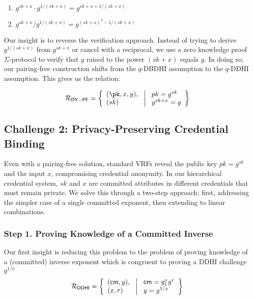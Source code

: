 \begin{enumerate}
    \item $g^{sk+x} \cdot g^{1/(sk+x)} = g^{sk+x+1/(sk+x)}$
    \item $g^{sk+x}/g^{1/(sk+x)} = g^{(sk+x)^2-1/(sk+x)}$
\end{enumerate}

Our insight is to reverse the verification approach. Instead of trying to derive $g^{1/(sk+x)}$ from $g^{sk+x}$ or cancel with a reciprocal, we use a zero knowledge proof $\Sigma$-protocol to verify that $y$ raised to the power $(sk+x)$ equals $g$. In doing so, our pairing-free construction shifts from the $q$-DBDHI assumption to the $q$-DDHI assumption. This gives us the relation:

\[
\mathcal{R}_{\mathsf{DY-PF}} = \left\{ 
\begin{array}{l} 
(\pk, x, y),\\
(sk) 
\end{array}
\ \middle|
\ \begin{array}{l}
pk = g^{sk} \\
y^{sk + x} = g  \\
\end{array} \right\}
\]

\subsection{Challenge 2: Privacy-Preserving Credential Binding}

Even with a pairing-free solution, standard VRFs reveal the public key $pk = g^{sk}$ and the input $x$,  compromising credential anonymity. In our hierarchical credential system, $sk$ and $x$ are committed attributes in different credentials that must remain private. We solve this through a two-step approach: first, addressing the simpler case of a single committed exponent, then extending to linear combinations.

\subsubsection*{Step 1. Proving Knowledge of a Committed Inverse}
Our first insight is reducing this problem to the problem of proving knowledge of a (committed) inverse exponent which is congruent to proving a DDHI challenge $g^{1/x}$
\[
\mathcal{R}_{\mathsf{DDHI}} = \left\{ 
\begin{array}{l} (\mathsf{cm}, y),\\
(x, r) 
\end{array}
\ \middle|
\ \begin{array}{l}
\mathsf{cm} = g_1^{x} g^r \\
y = g^{1/x} \\
\end{array} \right\}
\]

